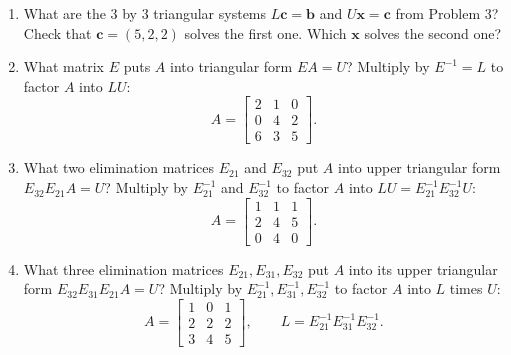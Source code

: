 \documentclass[14pt, a4paper]{article}
\begin{document}
\begin{enumerate}
          Row 3 of $\begin{bmatrix}A & \boldsymbol{b}\end{bmatrix} = (\ell_{31}\text{ Row }1 + \ell_{32}\text{ Row }2 + 1\text{ Row }3)$ of $\begin{bmatrix}U & \boldsymbol{c}\end{bmatrix}$.\\
          In matrix notation this is multiplication by $L$. So $A = LU$ and $\boldsymbol{b} = L\boldsymbol{c}$.

    \item What are the 3 by 3 triangular systems $L\boldsymbol{c} = \boldsymbol{b}$ and $U\boldsymbol{x} = \boldsymbol{c}$ from Problem 3? Check that $\boldsymbol{c} = (5,2,2)$ solves the first one. Which $\boldsymbol{x}$ solves the second one?

    \item What matrix $E$ puts $A$ into triangular form $EA = U$? Multiply by $E^{-1} = L$ to factor $A$ into $LU$:
          \[
              A = \begin{bmatrix}
                  2 & 1 & 0 \\
                  0 & 4 & 2 \\
                  6 & 3 & 5
              \end{bmatrix}.
          \]

    \item What two elimination matrices $E_{21}$ and $E_{32}$ put $A$ into upper triangular form $E_{32}E_{21}A = U$? Multiply by $E_{21}^{-1}$ and $E_{32}^{-1}$ to factor $A$ into $LU = E_{21}^{-1}E_{32}^{-1}U$:
          \[
              A = \begin{bmatrix}
                  1 & 1 & 1 \\
                  2 & 4 & 5 \\
                  0 & 4 & 0
              \end{bmatrix}.
          \]

    \item What three elimination matrices $E_{21}, E_{31}, E_{32}$ put $A$ into its upper triangular form $E_{32}E_{31}E_{21}A = U$? Multiply by $E_{21}^{-1}, E_{31}^{-1}, E_{32}^{-1}$ to factor $A$ into $L$ times $U$:
          \[
              A = \begin{bmatrix}
                  1 & 0 & 1 \\
                  2 & 2 & 2 \\
                  3 & 4 & 5
              \end{bmatrix},
              \qquad
              L = E_{21}^{-1}E_{31}^{-1}E_{32}^{-1}.
          \]


\end{enumerate}
\end{document}
